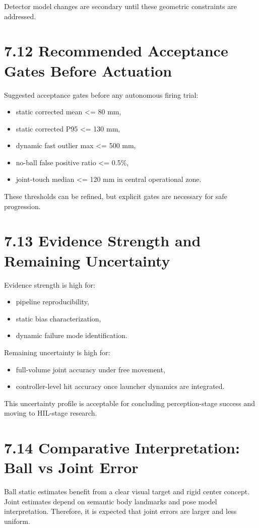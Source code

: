 Detector model changes are secondary until these geometric constraints are addressed.

\section{7.12 Recommended Acceptance Gates Before Actuation}
Suggested acceptance gates before any autonomous firing trial:
\begin{itemize}
  \item static corrected mean <= 80 mm,
  \item static corrected P95 <= 130 mm,
  \item dynamic fast outlier max <= 500 mm,
  \item no-ball false positive ratio <= 0.5\%,
  \item joint-touch median <= 120 mm in central operational zone.
\end{itemize}

These thresholds can be refined, but explicit gates are necessary for safe progression.

\section{7.13 Evidence Strength and Remaining Uncertainty}
Evidence strength is high for:
\begin{itemize}
  \item pipeline reproducibility,
  \item static bias characterization,
  \item dynamic failure mode identification.
\end{itemize}

Remaining uncertainty is high for:
\begin{itemize}
  \item full-volume joint accuracy under free movement,
  \item controller-level hit accuracy once launcher dynamics are integrated.
\end{itemize}

This uncertainty profile is acceptable for concluding perception-stage success and moving to HIL-stage research.



\section{7.14 Comparative Interpretation: Ball vs Joint Error}
Ball static estimates benefit from a clear visual target and rigid center concept. Joint estimates depend on semantic body landmarks and pose model interpretation. Therefore, it is expected that joint errors are larger and less uniform.

